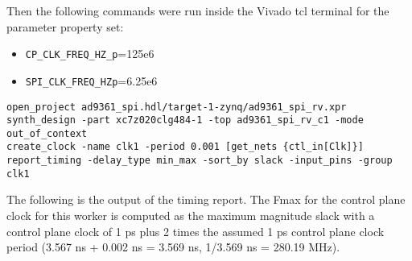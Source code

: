 \documentclass{article}
\begin{document}
\fontsize{10}{12}\selectfont
Then the following commands were run inside the Vivado tcl terminal for the parameter property set:
\begin{itemize}
	\item \verb+CP_CLK_FREQ_HZ_p+=125e6
	\item \verb+SPI_CLK_FREQ_HZp+=6.25e6
\end{itemize}
\begin{lstlisting}
open_project ad9361_spi.hdl/target-1-zynq/ad9361_spi_rv.xpr
synth_design -part xc7z020clg484-1 -top ad9361_spi_rv_c1 -mode out_of_context
create_clock -name clk1 -period 0.001 [get_nets {ctl_in[Clk]}]
report_timing -delay_type min_max -sort_by slack -input_pins -group clk1
\end{lstlisting}
The following is the output of the timing report. The Fmax for the control plane clock for this worker is computed as the maximum magnitude slack with a control plane clock of 1 ps plus 2 times the assumed 1 ps control plane clock period (3.567 ns + 0.002 ns = 3.569 ns, 1/3.569 ns = 280.19 MHz).
\fontsize{6}{12}\selectfont
\end{document}
